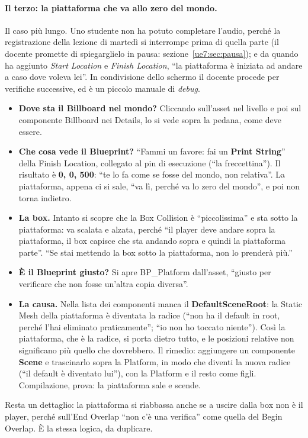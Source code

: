 \paragraph{Il terzo: la piattaforma che va allo zero del mondo.} Il caso più lungo. Uno
studente non ha potuto completare l'audio, perché la registrazione della lezione di
martedì si interrompe prima di quella parte (il docente promette di spiegarglielo in
pausa: sezione~\ref{ue7:sec:pausa}); e da quando ha aggiunto \emph{Start Location} e
\emph{Finish Location}, ``la piattaforma è iniziata ad andare a caso dove voleva lei''.
In condivisione dello schermo il docente procede per verifiche successive, ed è un
piccolo manuale di \emph{debug}.
\begin{itemize}
  \item \textbf{Dove sta il Billboard nel mondo?} Cliccando sull'asset nel livello e poi
        sul componente Billboard nei Details, lo si vede sopra la pedana, come deve
        essere.
  \item \textbf{Che cosa vede il Blueprint?} ``Fammi un favore: fai un \textbf{Print
        String}'' della Finish Location, collegato al pin di esecuzione (``la
        freccettina''). Il risultato è \textbf{0, 0, 500}: ``te lo fa come se fosse del
        mondo, non relativa''. La piattaforma, appena ci si sale, ``va lì, perché va lo
        zero del mondo'', e poi non torna indietro.
  \item \textbf{La box.} Intanto si scopre che la Box Collision è ``piccolissima'' e sta
        sotto la piattaforma: va scalata e alzata, perché ``il player deve andare sopra
        la piattaforma, il box capisce che sta andando sopra e quindi la piattaforma
        parte''. ``Se stai mettendo la box sotto la piattaforma, non lo prenderà più.''
  \item \textbf{È il Blueprint giusto?} Si apre BP\_Platform dall'asset, ``giusto per
        verificare che non fosse un'altra copia diversa''.
  \item \textbf{La causa.} Nella lista dei componenti manca il
        \textbf{DefaultSceneRoot}: la Static Mesh della piattaforma è diventata la
        radice (``non ha il default in root, perché l'hai eliminato praticamente'';
        ``io non ho toccato niente''). Così la piattaforma, che è la radice, si porta
        dietro tutto, e le posizioni relative non significano più quello che dovrebbero.
        Il rimedio: aggiungere un componente \textbf{Scene} e trascinarlo sopra la
        Platform, in modo che diventi la nuova radice (``il default è diventato lui''),
        con la Platform e il resto come figli. Compilazione, prova: la piattaforma sale
        e scende.
\end{itemize}
Resta un dettaglio: la piattaforma si riabbassa anche se a uscire dalla box non è il
player, perché sull'End Overlap ``non c'è una verifica'' come quella del Begin Overlap.
È la stessa logica, da duplicare.


